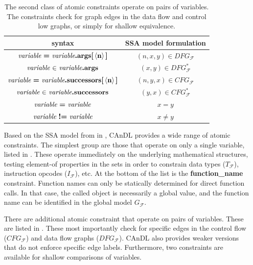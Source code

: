 \begin{table}[t]
  \centering
  \begin{tabular}{|c|c|}
    \hline
    syntax & SSA model formulation \\
    \hline
    \hline
    $\text{\it variable}\ \text{\bf =}\ \text{\it variable}\text{\bf.args[}\left<\text{\bf n}\right>\text{\bf]}$ & $(n,x,y)\in DFG_\mathcal F$\\
    $\text{\it variable}\ \text{\bf $\in$}\ \text{\it variable}\text{\bf .args}$ & $(x,y)\in DFG_\mathcal F^*$\\
    \hline
    $\text{\it variable}\ \text{\bf =}\ \text{\it variable}\text{\bf.successors[}\left<\text{\bf n}\right>\text{\bf]}$ & $(n,y,x)\in CFG_\mathcal F$\\
    $\text{\it variable}\ \text{\bf $\in$}\ \text{\it variable}\text{\bf .successors}$ & $(y,x)\in CFG_\mathcal F^*$\\
    \hline
    $\text{\it variable}\ \text{\bf =}\ \text{\it variable}$ & $x=y$\\
    $\text{\it variable}\ \text{\bf !=}\ \text{\it variable}$ & $x\neq y$\\
    \hline
  \end{tabular}
  \caption{The second class of atomic constraints operate on pairs of variables.
           The constraints check for graph edges in the
           data flow and control low graphs, or simply for shallow equivalence.
           \parfillskip=0pt}
  \label{twovaratomics}
\end{table}

    Based on the SSA model from  in ,
    CAnDL provides a wide range of atomic constraints.
    The simplest group are those that operate on only a single variable,
    listed in .
    These operate immediately on the underlying mathematical structures, testing
    element-of properties in the sets in order to constrain data types
    ($T_\mathcal{F}$), instruction opcodes ($I_\mathcal{F}$), etc.
    At the bottom of the list is the {\bf function\_name} constraint.
    Function names can only be statically determined for direct function calls.
    In that case, the called object is necessarily a global value, and the
    function name can be identified in the global model $G_\mathcal F$.

    There are additional atomic constraint that operate on pairs of variables.
    These are listed in .
    These most importantly check for specific edges in the control flow
    ($CFG_\mathcal F$) and data flow graphs ($DFG_\mathcal F$).
    CAnDL also provides weaker versions that do not enforce specific edge
    labels.
    Furthermore, two constraints are available for shallow comparisons of
    variables.


